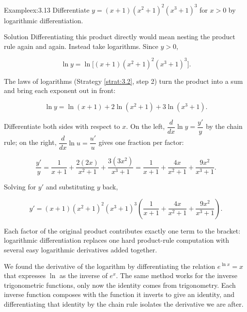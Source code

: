 \documentclass[a4paper,12pt,oneside]{memoir}
\begin{document}
\begin{workedexample}
\begin{envexample}{Example}{ex:3.13}{}
Differentiate \(y = (x + 1)(x^{2} + 1)^{2}(x^{3} + 1)^{3}\) for \(x > 0\) by logarithmic differentiation.
\end{envexample}
\begin{envsolution}{Solution}{}{}
Differentiating this product directly would mean nesting the product rule again and again. Instead take logarithms. Since \(y > 0\),

\[ \ln y = \ln\!\bigl[(x + 1)(x^{2} + 1)^{2}(x^{3} + 1)^{3}\bigr]. \]

The laws of logarithms (Strategy \ref{strat:3.2}, step 2) turn the product into a sum and bring each exponent out in front:

\[ \ln y = \ln(x + 1) + 2\ln(x^{2} + 1) + 3\ln(x^{3} + 1). \]

Differentiate both sides with respect to \(x\). On the left, \(\dfrac{d}{dx}\ln y = \dfrac{y'}{y}\) by the chain rule; on the right, \(\dfrac{d}{dx}\ln u = \dfrac{u'}{u}\) gives one fraction per factor:

\[ \frac{y'}{y} = \frac{1}{x + 1} + \frac{2(2x)}{x^{2} + 1} + \frac{3(3x^{2})}{x^{3} + 1} = \frac{1}{x + 1} + \frac{4x}{x^{2} + 1} + \frac{9x^{2}}{x^{3} + 1}. \]

Solving for \(y'\) and substituting \(y\) back,

\[ y' = (x + 1)(x^{2} + 1)^{2}(x^{3} + 1)^{3}\left(\frac{1}{x + 1} + \frac{4x}{x^{2} + 1} + \frac{9x^{2}}{x^{3} + 1}\right). \]

Each factor of the original product contributes exactly one term to the bracket: logarithmic differentiation replaces one hard product-rule computation with several easy logarithmic derivatives added together.
\end{envsolution}
\end{workedexample}
We found the derivative of the logarithm by differentiating the relation \(e^{\ln x} = x\) that expresses \(\ln\) as the inverse of \(e^{x}\). The same method works for the inverse trigonometric functions, only now the identity comes from trigonometry. Each inverse function composes with the function it inverts to give an identity, and differentiating that identity by the chain rule isolates the derivative we are after.
\end{document}
